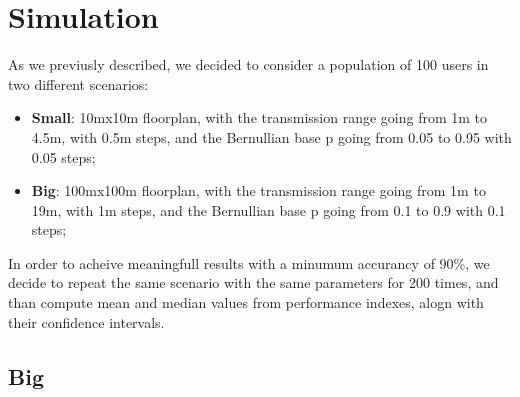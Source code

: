 %

\chapter{Simulation}\label{simulation}
As we previusly described, we decided to consider a population of 100 users in two different scenarios:
\begin{itemize}
    \item \textbf{Small}: 10mx10m floorplan, with the transmission range going from 1m to 4.5m, with 0.5m steps, and
        the Bernullian base p going from 0.05 to 0.95 with 0.05 steps; 
    \item \textbf{Big}: 100mx100m floorplan, with the transmission range going from 1m to 19m, with 1m steps, and
        the Bernullian base p going from 0.1 to 0.9 with 0.1 steps; 
\end{itemize}
In order to acheive meaningfull results with a minumum accurancy of 90\%, we decide to repeat the same scenario with
the same parameters for 200 times, and than compute mean and median values from performance indexes, alogn with their confidence intervals.
\section{Big}\label{big}
